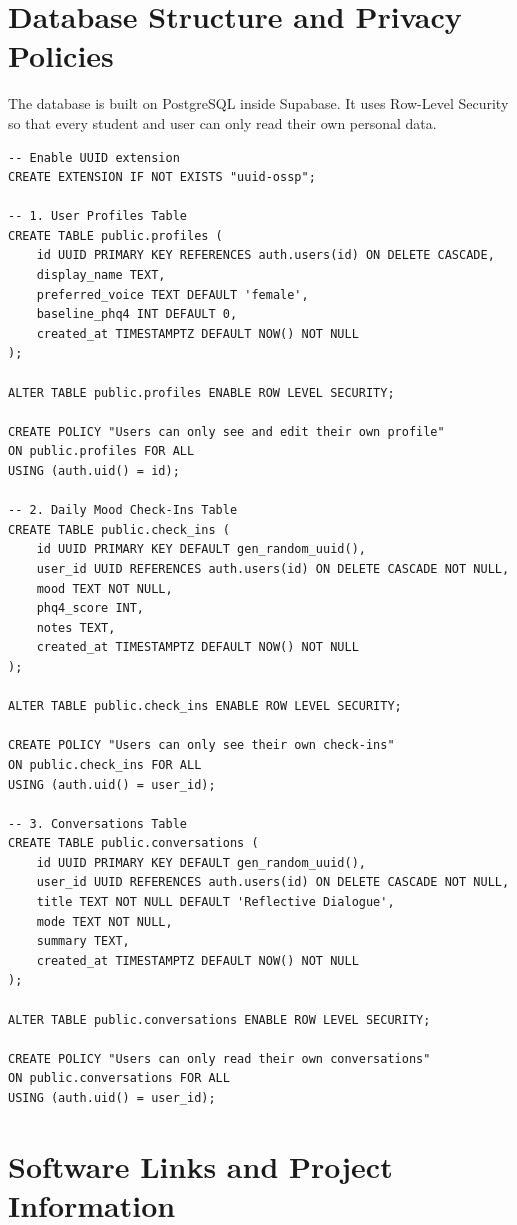 \documentclass[USenglish,a4paper,12pt]{nitathesis}
\begin{document}
\chapter{Database Structure and Privacy Policies}
\label{app:schema}

The database is built on PostgreSQL inside Supabase. It uses Row-Level Security so that every student and user can only read their own personal data.

\begin{verbatim}
-- Enable UUID extension
CREATE EXTENSION IF NOT EXISTS "uuid-ossp";

-- 1. User Profiles Table
CREATE TABLE public.profiles (
    id UUID PRIMARY KEY REFERENCES auth.users(id) ON DELETE CASCADE,
    display_name TEXT,
    preferred_voice TEXT DEFAULT 'female',
    baseline_phq4 INT DEFAULT 0,
    created_at TIMESTAMPTZ DEFAULT NOW() NOT NULL
);

ALTER TABLE public.profiles ENABLE ROW LEVEL SECURITY;

CREATE POLICY "Users can only see and edit their own profile"
ON public.profiles FOR ALL
USING (auth.uid() = id);

-- 2. Daily Mood Check-Ins Table
CREATE TABLE public.check_ins (
    id UUID PRIMARY KEY DEFAULT gen_random_uuid(),
    user_id UUID REFERENCES auth.users(id) ON DELETE CASCADE NOT NULL,
    mood TEXT NOT NULL,
    phq4_score INT,
    notes TEXT,
    created_at TIMESTAMPTZ DEFAULT NOW() NOT NULL
);

ALTER TABLE public.check_ins ENABLE ROW LEVEL SECURITY;

CREATE POLICY "Users can only see their own check-ins"
ON public.check_ins FOR ALL
USING (auth.uid() = user_id);

-- 3. Conversations Table
CREATE TABLE public.conversations (
    id UUID PRIMARY KEY DEFAULT gen_random_uuid(),
    user_id UUID REFERENCES auth.users(id) ON DELETE CASCADE NOT NULL,
    title TEXT NOT NULL DEFAULT 'Reflective Dialogue',
    mode TEXT NOT NULL,
    summary TEXT,
    created_at TIMESTAMPTZ DEFAULT NOW() NOT NULL
);

ALTER TABLE public.conversations ENABLE ROW LEVEL SECURITY;

CREATE POLICY "Users can only read their own conversations"
ON public.conversations FOR ALL
USING (auth.uid() = user_id);
\end{verbatim}

\chapter{Software Links and Project Information}
\label{app:publications}
\end{document}
